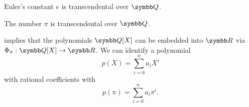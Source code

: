 \begin{theorem}\label{thm:e_is_transcendental}\label{thm:eulers_constant_is_transcendental}
  Euler's constant \( e \) is transcendental over \( \Q \).
\end{theorem}

\begin{theorem}\label{thm:pi_is_transcendental}\cite[454]{Knapp2016BAlg}
  The number \( \pi \) is transcendental over \( \Q \).
\end{theorem}

\begin{example}\label{ex:polynomials_over_pi}
   implies that the polynomials \( \Q[X] \) can be embedded into \( \R \) via \( \Phi_\pi: \Q[X] \to \R \). We can identify a polynomial
  \begin{equation*}
    p(X) = \sum_{i=0}^n a_i X^i
  \end{equation*}
  with rational coefficients with
  \begin{equation*}
    p(\pi) = \sum_{i=0}^n a_i \pi^i.
  \end{equation*}
\end{example}

